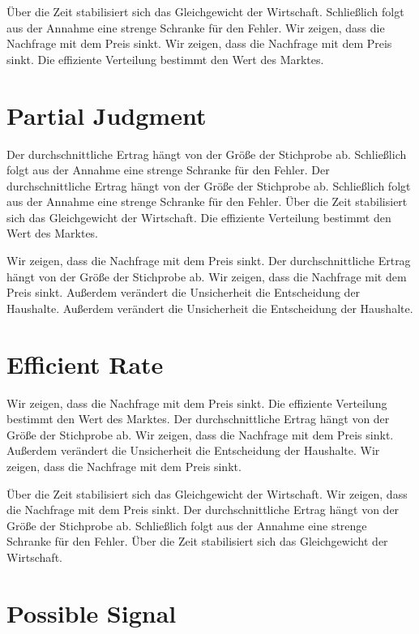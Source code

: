 \documentclass[11pt]{article}
\begin{document}
Über die Zeit stabilisiert sich das Gleichgewicht der Wirtschaft. Schließlich folgt aus der Annahme eine strenge Schranke für den Fehler. Wir zeigen, dass die Nachfrage mit dem Preis sinkt. Wir zeigen, dass die Nachfrage mit dem Preis sinkt. Die effiziente Verteilung bestimmt den Wert des Marktes.

\section{Partial Judgment}\label{sec:28}

Der durchschnittliche Ertrag hängt von der Größe der Stichprobe ab. Schließlich folgt aus der Annahme eine strenge Schranke für den Fehler. Der durchschnittliche Ertrag hängt von der Größe der Stichprobe ab. Schließlich folgt aus der Annahme eine strenge Schranke für den Fehler. Über die Zeit stabilisiert sich das Gleichgewicht der Wirtschaft. Die effiziente Verteilung bestimmt den Wert des Marktes.

Wir zeigen, dass die Nachfrage mit dem Preis sinkt. Der durchschnittliche Ertrag hängt von der Größe der Stichprobe ab. Wir zeigen, dass die Nachfrage mit dem Preis sinkt. Außerdem verändert die Unsicherheit die Entscheidung der Haushalte. Außerdem verändert die Unsicherheit die Entscheidung der Haushalte.

\section{Efficient Rate}\label{sec:29}

Wir zeigen, dass die Nachfrage mit dem Preis sinkt. Die effiziente Verteilung bestimmt den Wert des Marktes. Der durchschnittliche Ertrag hängt von der Größe der Stichprobe ab. Wir zeigen, dass die Nachfrage mit dem Preis sinkt. Außerdem verändert die Unsicherheit die Entscheidung der Haushalte. Wir zeigen, dass die Nachfrage mit dem Preis sinkt.

Über die Zeit stabilisiert sich das Gleichgewicht der Wirtschaft. Wir zeigen, dass die Nachfrage mit dem Preis sinkt. Der durchschnittliche Ertrag hängt von der Größe der Stichprobe ab. Schließlich folgt aus der Annahme eine strenge Schranke für den Fehler. Über die Zeit stabilisiert sich das Gleichgewicht der Wirtschaft.

\section{Possible Signal}\label{sec:30}
\end{document}
